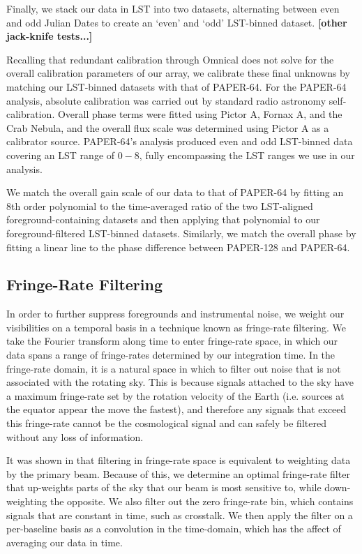 \documentclass[preprint2,numberedappendix,tighten,twocolappendix]{aastex6}  %
\newcommand{\cc}[1]{{\color{purple} \textbf{[#1]}}}
\begin{document}
Finally, we stack our data in LST into two datasets, alternating between even and odd Julian Dates to create an `even' and `odd' LST-binned dataset. \cc{other jack-knife tests...}

Recalling that redundant calibration through {\sc Omnical} does not solve for the overall calibration parameters of our array, we calibrate these final unknowns by matching our LST-binned datasets with that of PAPER-64. For the PAPER-64 analysis, absolute calibration was carried out by standard radio astronomy self-calibration. Overall phase terms were fitted using Pictor A, Fornax A, and the Crab Nebula, and the overall flux scale was determined using Pictor A as a calibrator source. PAPER-64's analysis produced even and odd LST-binned data covering an LST range of $0-8$, fully encompassing the LST ranges we use in our analysis. 

We match the overall gain scale of our data to that of PAPER-64 by fitting an 8th order polynomial to the time-averaged ratio of the two LST-aligned foreground-containing datasets and then applying that polynomial to our foreground-filtered LST-binned datasets. Similarly, we match the overall phase by fitting a linear line to the phase difference between PAPER-128 and PAPER-64. 

\subsection{Fringe-Rate Filtering}

In order to further suppress foregrounds and instrumental noise, we weight our visibilities on a temporal basis in a technique known as fringe-rate filtering. We take the Fourier transform along time to enter fringe-rate space, in which our data spans a range of fringe-rates determined by our integration time. In the fringe-rate domain, it is a natural space in which to filter out noise that is not associated with the rotating sky. This is because signals attached to the sky have a maximum fringe-rate set by the rotation velocity of the Earth (i.e. sources at the equator appear the move the fastest), and therefore any signals that exceed this fringe-rate cannot be the cosmological signal and can safely be filtered without any loss of information. 

It was shown in \citet{parsons_et_al2016} that filtering in fringe-rate space is equivalent to weighting data by the primary beam. Because of this, we determine an optimal fringe-rate filter that up-weights parts of the sky that our beam is most sensitive to, while down-weighting the opposite. We also filter out the zero fringe-rate bin, which contains signals that are constant in time, such as crosstalk. We then apply the filter on a per-baseline basis as a convolution in the time-domain, which has the affect of averaging our data in time. 
\end{document}
